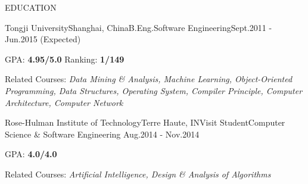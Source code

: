 \documentclass{resume} %
\begin{document}

\begin{rSection}{EDUCATION}

  \begin{eSubsection}{Tongji University}{Shanghai, China}{B.Eng.}{Software Engineering}{Sept.2011 - Jun.2015
    (Expected)}
  \item GPA: {\bf 4.95/5.0} \space\space Ranking: {\bf 1/149}
  \item Related Courses: {\em Data Mining \& Analysis, Machine Learning, Object-Oriented Programming, Data Structures, Operating System, Compiler Principle,
    Computer Architecture, Computer Network}
  \end{eSubsection}

  \begin{eSubsection}{Rose-Hulman Institute of Technology}{Terre Haute, IN}{Visit Student}{Computer
    Science \& Software Engineering}{ Aug.2014 - Nov.2014}
  \item GPA: {\bf 4.0/4.0}
  \item Related Courses: {\em Artificial Intelligence, Design \& Analysis of Algorithms}
  \end{eSubsection}

\end{rSection}

\end{document}
